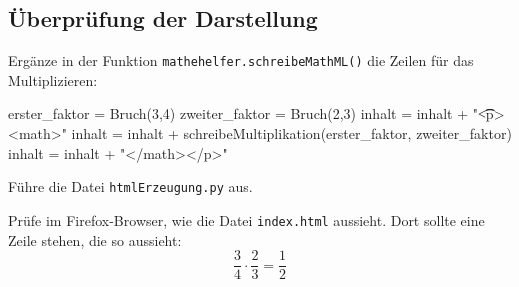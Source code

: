 \subsection*{Überprüfung der Darstellung}

Ergänze in der Funktion \texttt{mathehelfer.schreibeMathML()} die Zeilen für das Multiplizieren:

\begin{codePython}
erster_faktor = Bruch(3,4)
zweiter_faktor = Bruch(2,3)
inhalt = inhalt + "\n\t\t<p><math>"
inhalt = inhalt + schreibeMultiplikation(erster_faktor, zweiter_faktor)
inhalt = inhalt + "</math></p>"
\end{codePython}

Führe die Datei \texttt{htmlErzeugung.py} aus.

Prüfe im Firefox-Browser, wie die Datei \texttt{index.html} aussieht. Dort sollte eine Zeile stehen, die so aussieht:
\[
\frac{3}{4} \cdot \frac{2}{3} = \frac{1}{2}
\]
